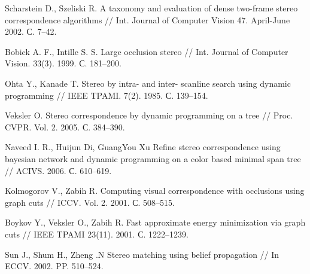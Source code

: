 
\begin{thebibliography}{1}
	Scharstein D., Szeliski R. A taxonomy and evaluation of dense
	two-frame stereo correspondence algorithms // Int. Journal of
	Computer Vision 47. April-June 2002. С. 7–42.
	
	Bobick A. F., Intille S. S. Large occlusion stereo // Int. Journal
	of Computer Vision. 33(3). 1999. С. 181–200.
	
	Ohta Y., Kanade T. Stereo by intra- and inter- scanline search
	using dynamic programming // IEEE TPAMI. 7(2). 1985.
	С. 139–154.
	
	Veksler O. Stereo correspondence by dynamic programming on a
	tree // Proc. CVPR. Vol. 2. 2005. С. 384–390.
	
	Naveed I. R., Huijun Di, GuangYou Xu Refine stereo
	correspondence using bayesian network and dynamic programming
	on a color based minimal span tree // ACIVS. 2006. С. 610–619.
	
	Kolmogorov V., Zabih R. Computing visual correspondence with
	occlusions using graph cuts // ICCV. Vol. 2. 2001. С. 508–515.
	
	Boykov Y., Veksler O., Zabih R. Fast approximate energy
	minimization via graph cuts // IEEE TPAMI 23(11). 2001.
	С. 1222–1239.
	
	Sun J., Shum H., Zheng .N Stereo matching using belief
	propagation // In ECCV. 2002. PP. 510–524.
\end{thebibliography}

